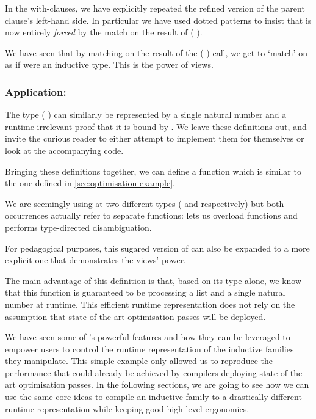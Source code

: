 In the with-clauses, we have explicitly repeated the refined version
of the parent clause's left-hand side. In particular we have used dotted
patterns to insist that  is now entirely \emph{forced}
by the match on the result of ( ).

We have seen that by matching on the result of the
( ) call,
we get to `match' on  as if  were an
inductive type.
%
This is the power of views.

\subsubsection{Application: }

The type ( ) can similarly be represented by a
single natural number and a runtime irrelevant proof that it is bound by
.
%
We leave these definitions out, and invite the curious reader
to either attempt to implement them for themselves or look at the accompanying code.

Bringing these definitions together, we can define a 
function which is  similar to the one defined in \cref{sec:optimisation-example}.


We are seemingly using  at two different types (
and  respectively) but both occurrences actually refer to separate
functions: \idris{} lets us overload functions and performs type-directed disambiguation.

For pedagogical purposes, this sugared version of  can
also be expanded to a more explicit one that demonstrates the views' power.



The main advantage of this definition is that, based on its type alone, we know
that this function is guaranteed to be processing a list and a single natural
number at runtime.
%
This efficient runtime representation does not rely on the assumption that state
of the art optimisation passes will be deployed.


We have seen some of \idris{}'s powerful features and how they can be leveraged
to empower users to control the runtime representation of the inductive families
they manipulate.
%
This simple example only allowed us to reproduce the performance that could already
be achieved by compilers deploying state of the art optimisation passes.
%
In the following sections, we are going to see how we can use the same core ideas
to compile an inductive family to a drastically different runtime representation
while keeping good high-level ergonomics.
